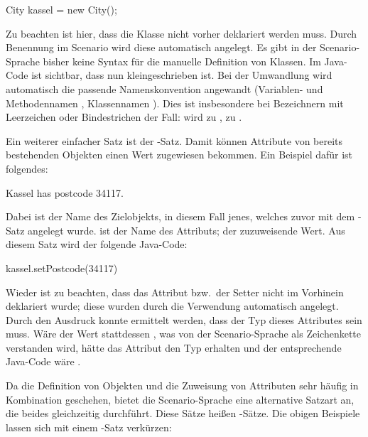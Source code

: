 \begin{jcodeblock}
    City kassel = new City();
\end{jcodeblock}

Zu beachten ist hier, dass die Klasse  nicht vorher deklariert werden muss.
Durch Benennung im Scenario wird diese automatisch angelegt.
Es gibt in der Scenario-Sprache bisher keine Syntax für die manuelle Definition von Klassen.
Im Java-Code ist sichtbar, dass  nun kleingeschrieben ist.
Bei der Umwandlung wird automatisch die passende Namenskonvention angewandt (Variablen- und Methodennamen , Klassennamen ).
Dies ist insbesondere bei Bezeichnern mit Leerzeichen oder Bindestrichen der Fall:
 wird zu ,  zu .

Ein weiterer einfacher Satz ist der -Satz.
Damit können Attribute von bereits bestehenden Objekten einen Wert zugewiesen bekommen.
Ein Beispiel dafür ist folgendes:

\begin{codeblock}
    Kassel has postcode 34117.
\end{codeblock}

Dabei ist  der Name des Zielobjekts, in diesem Fall jenes, welches zuvor mit dem -Satz angelegt wurde.
 ist der Name des Attributs;  der zuzuweisende Wert.
Aus diesem Satz wird der folgende Java-Code:

\begin{jcodeblock}
    kassel.setPostcode(34117)
\end{jcodeblock}

Wieder ist zu beachten, dass das Attribut  bzw.\ der Setter  nicht im Vorhinein deklariert wurde;
diese wurden durch die Verwendung automatisch angelegt.
Durch den Ausdruck  konnte ermittelt werden, dass der Typ dieses Attributes  sein muss.
Wäre der Wert stattdessen , was von der Scenario-Sprache als Zeichenkette verstanden wird, hätte das Attribut den Typ  erhalten und der entsprechende Java-Code wäre .

Da die Definition von Objekten und die Zuweisung von Attributen sehr häufig in Kombination geschehen, bietet die Scenario-Sprache eine alternative Satzart an, die beides gleichzeitig durchführt.
Diese Sätze heißen -Sätze.
Die obigen Beispiele lassen sich mit einem -Satz verkürzen:

